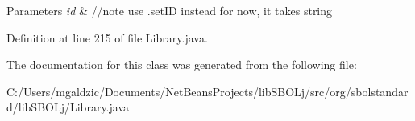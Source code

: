 \begin{DoxyParams}{Parameters}
{\em id} & //note use .setID instead for now, it takes string \\
\hline
\end{DoxyParams}


Definition at line 215 of file Library.java.



The documentation for this class was generated from the following file:\begin{DoxyCompactItemize}
\item 
C:/Users/mgaldzic/Documents/NetBeansProjects/libSBOLj/src/org/sbolstandard/libSBOLj/Library.java\end{DoxyCompactItemize}
